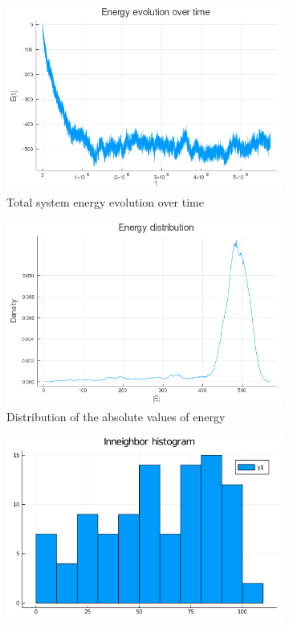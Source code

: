 \documentclass[12pt,openright,twoside]{book}
\begin{document}
\begin{appendices}
\begin{figure}[!htb]
\centering
\begin{subfigure}{0.47\linewidth}
    \includegraphics[width=\linewidth]{figures/2_2_t1/energy_evolution.png}
    \caption{Total system energy evolution over time}
\end{subfigure}
\begin{subfigure}{0.47\linewidth}
    \includegraphics[width=\linewidth]{figures/2_2_t1/energy_distribution.png}
    \caption{Distribution of the absolute values of energy}
\end{subfigure}
\begin{subfigure}{0.47\linewidth}
    \includegraphics[width=\linewidth]{figures/2_2_t1/InneighborHistogram_temp=1.png}

\end{subfigure}
\end{figure}
\end{appendices}
\end{document}
